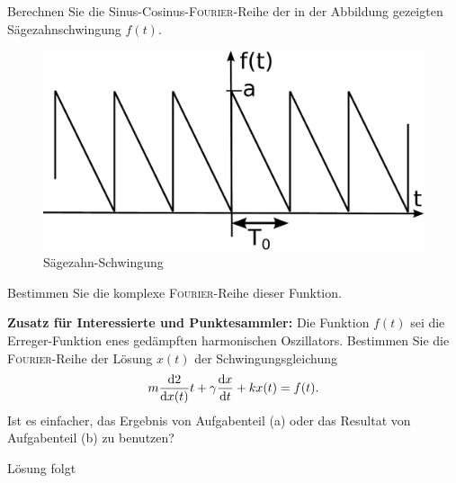 \documentclass{atistandalonetask}
\begin{document}
  \begin{atiTask}[
    title = Sägezahnschwingung
  ]


	\begin{atiSubtasks}
		\item Berechnen Sie die Sinus-Cosinus-\textsc{Fourier}-Reihe der in der Abbildung gezeigten Sägezahnschwingung $f(t)$.
		\begin{figure}[H]
			\centering
			\includegraphics[width=0.7\linewidth]{picture-fourier_vVersion2}
			\caption{Sägezahn-Schwingung}
			\end{figure}
		\item Bestimmen Sie die komplexe \textsc{Fourier}-Reihe dieser Funktion.
		\item \textbf{Zusatz für Interessierte und Punktesammler:} Die Funktion $f(t)$ sei die Erreger-Funktion enes gedämpften harmonischen Oszillators. Bestimmen Sie die \textsc{Fourier}-Reihe der Lösung $x(t)$ der Schwingungsgleichung
			\[
			m\leibnizDerivative{2}{x(t)}{t}+\gamma \leibnizDerivative{x}{t}+kx(t)=f(t).
			\]	
		Ist es einfacher, das Ergebnis von Aufgabenteil (a) oder das Resultat von Aufgabenteil (b) zu benutzen?	
	\end{atiSubtasks} 
  \end{atiTask}
  \begin{atiSolution}
   Lösung folgt
  \end{atiSolution}
\end{document}

